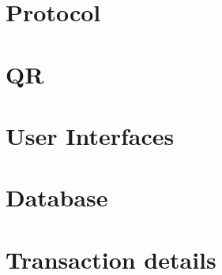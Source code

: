 \chapter{Protocol}


\chapter{QR}


\chapter{User Interfaces}


\chapter{Database}


\chapter{Transaction details}

